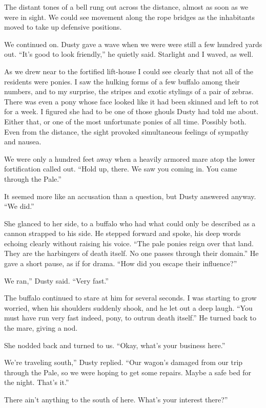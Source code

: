 The distant tones of a bell rung out across the distance, almost as soon as we were in sight. We could see movement along the rope bridges as the inhabitants moved to take up defensive positions.

We continued on. Dusty gave a wave when we were were still a few hundred yards out. “It’s good to look friendly,” he quietly said. Starlight and I waved, as well.

As we drew near to the fortified lift-house I could see clearly that not all of the residents were ponies. I saw the hulking forms of a few buffalo among their numbers, and to my surprise, the stripes and exotic stylings of a pair of zebras. There was even a pony whose face looked like it had been skinned and left to rot for a week. I figured she had to be one of those ghouls Dusty had told me about. Either that, or one of the most unfortunate ponies of all time. Possibly both. Even from the distance, the sight provoked simultaneous feelings of sympathy and nausea.

We were only a hundred feet away when a heavily armored mare atop the lower fortification called out. “Hold up, there. We saw you coming in. You came through the Pale.”

It seemed more like an accusation than a question, but Dusty answered anyway. “We did.”

She glanced to her side, to a buffalo who had what could only be described as a cannon strapped to his side. He stepped forward and spoke, his deep words echoing clearly without raising his voice. “The pale ponies reign over that land. They are the harbingers of death itself. No one passes through their domain.” He gave a short pause, as if for drama. “How did you escape their influence?”

\leavevmode{}We ran,” Dusty said. “Very fast.”

The buffalo continued to stare at him for several seconds. I was starting to grow worried, when his shoulders suddenly shook, and he let out a deep laugh. “You must have run very fast indeed, pony, to outrun death itself.” He turned back to the mare, giving a nod.

She nodded back and turned to us. “Okay, what’s your business here.”

\leavevmode{}We’re traveling south,” Dusty replied. “Our wagon’s damaged from our trip through the Pale, so we were hoping to get some repairs. Maybe a safe bed for the night. That’s it.”

\leavevmode{}There ain’t anything to the south of here. What’s your interest there?”

